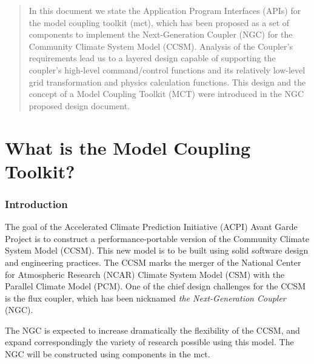 \documentclass{article}
\begin{document}
\vspace*{\fill}


\newpage
\setcounter{page}{3}     %

\vspace*{\fill}

\begin{abstract}
In this document we state the Application Program Interfaces (APIs)
 for the model coupling toolkit (mct), which has been proposed as
a set of components to implement the Next-Generation
Coupler (NGC) for the Community Climate System Model (CCSM).
Analysis of the Coupler's requirements lead us to a layered
design capable of supporting the coupler's high-level
command/control functions and its relatively low-level grid
transformation and physics calculation functions.  This design
and the concept of a Model Coupling Toolkit (MCT) were introduced 
in the NGC proposed design document.
\end{abstract}

\vspace*{\fill}
\newpage

\tableofcontents
\newpage



\part{What is the Model Coupling Toolkit?}

\section{Introduction}

The goal of the Accelerated Climate Prediction Initiative (ACPI)
Avant Garde Project is to construct a performance-portable
version of the Community Climate System Model (CCSM).  This new
model is to be built using solid software design and engineering
practices.  The CCSM marks the merger of the National Center for
Atmospheric Research (NCAR) Climate System Model (CSM) with the
Parallel Climate Model (PCM).   One of the chief design
challenges for the CCSM is the flux coupler, which has been
nicknamed {\em the Next-Generation Coupler} (NGC).

The NGC is expected to increase dramatically the flexibility of
the CCSM, and expand correspondingly the variety of research
possible using this model.  The NGC will be constructed using 
components in the mct.
\end{document}
